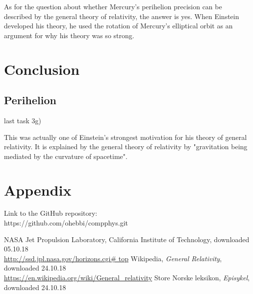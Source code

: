 \documentclass{article}
\begin{document}
\vskip0.5cm
As for the question about whether Mercury's perihelion precision can be described by the general theory of relativity, the answer is yes. When Einstein developed his theory, he used the rotation of Mercury's elliptical orbit as an argument for why his theory was so strong. \cite{wiki_rel}



\section{Conclusion}


\subsection{Perihelion}
last task 3g)

This was actually one of Einstein's strongest motivation for his theory of general relativity.
It is explained by the general theory of relativity by "gravitation being mediated by the curvature of spacetime".

\section{Appendix}
Link to the GitHub repository:\\

https://github.com/ohebbi/compphys.git

\begin{thebibliography}{}
NASA Jet Propulsion Laboratory, California Institute of Technology, downloaded 05.10.18\\
\url{http://ssd.jpl.nasa.gov/horizons.cgi# top}
Wikipedia, \textit{General Relativity}, downloaded 24.10.18\\
\url{https://en.wikipedia.org/wiki/General_relativity}
Store Norske leksikon, \textit{Episykel}, downloaded 24.10.18\\
\end{thebibliography}
\end{document}
